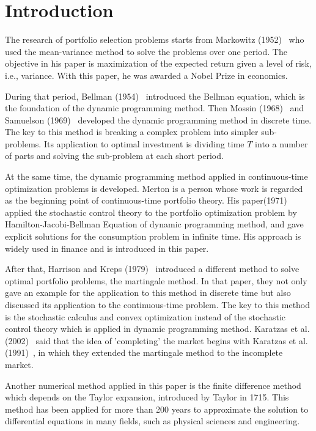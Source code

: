 \documentclass[a4paper]{article}
\theoremstyle{definition}
\numberwithin{equation}{section}
\begin{document}

\section{Introduction}
The research of portfolio selection problems starts from Markowitz (1952)~\cite{mark 52} who used the mean-variance method to solve the problems over one period. The objective in his paper is maximization of the expected return given a level of risk, i.e., variance. With this paper, he was awarded a Nobel Prize in economics.

During that period, Bellman (1954)~\cite{bellman 54} introduced the Bellman equation, which is the foundation of the dynamic programming method. Then Mossin (1968)~\cite{mossin 68} and Samuelson (1969)~\cite{sam 69} developed the dynamic programming method in discrete time. The key to this method is breaking a complex problem into simpler sub-problems. Its application to optimal investment is dividing time $T$ into a number of parts and solving the sub-problem at each short period.

At the same time, the dynamic programming method applied in continuous-time optimization problems is developed. Merton is a person whose work is regarded as the beginning point of continuous-time portfolio theory. His paper(1971)~\cite{merton} applied the stochastic control theory to the portfolio optimization problem by Hamilton-Jacobi-Bellman Equation of dynamic programming method, and gave explicit solutions for the consumption problem in infinite time. His approach is widely used in finance and is introduced in this paper.

After that, Harrison and Kreps (1979)~\cite{HK 79} introduced a different method to solve optimal portfolio problems, the martingale method. In that paper, they not only gave an example for the application to this method in discrete time but also discussed its application to the continuous-time problem. The key to this method is the stochastic calculus and convex optimization instead of the stochastic control theory which is applied in dynamic programming method. Karatzas et al. (2002)~\cite{completing} said that the idea of 'completing' the market begins with Karatzas et al. (1991)~\cite{KL 91}, in which they extended the martingale method to the incomplete market.

Another numerical method applied in this paper is the finite difference method which depends on the Taylor expansion, introduced by Taylor in 1715. This method has been applied for more than 200 years to approximate the solution to differential equations in many fields, such as physical sciences and engineering.
\end{document}
